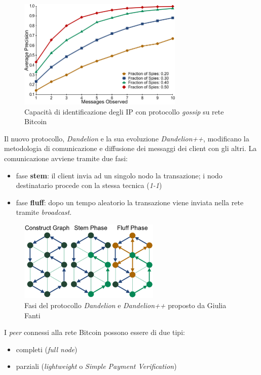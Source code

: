 \begin{figure}
    \centering
    \includegraphics[width=0.7\textwidth]{images/gossip_attack.png}
    \caption{Capacità di identificazione degli IP con protocollo \textit{gossip} su rete Bitcoin}
\end{figure}
Il nuovo protocollo, \textit{Dandelion} e la sua evoluzione \textit{Dandelion++}, modificano la metodologia di comunicazione e diffusione dei messaggi dei client con gli altri. La comunicazione avviene tramite due fasi: 
\begin{itemize}
    \item fase \textbf{stem}: il client invia ad un singolo nodo la transazione; i nodo destinatario procede con la stessa tecnica (\textit{1-1})
    \item fase \textbf{fluff}: dopo un tempo aleatorio la transazione viene inviata nella rete tramite \textit{broadcast}.
\end{itemize}
\begin{figure}[H]
    \centering
    \includegraphics[width=0.6\textwidth]{images/dandelion.png}
    \caption{Fasi del protocollo \textit{Dandelion} e \textit{Dandelion++} proposto da Giulia Fanti}
\end{figure}
I \textit{peer} connessi alla rete Bitcoin possono essere di due tipi:
\begin{itemize}
    \item completi (\textit{full node})
    \item parziali (\textit{lightweight} o \textit{Simple Payment Verification})
\end{itemize}
